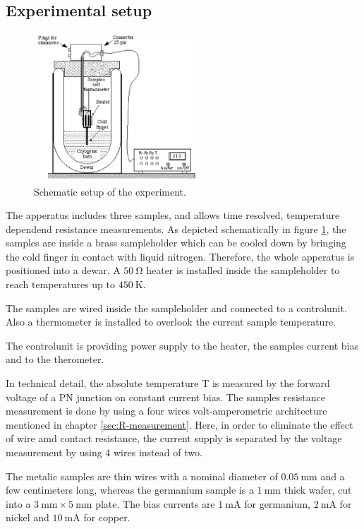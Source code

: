 \subsection{Experimental setup}
\label{sec:setup}

\begin{figure}
  \centering
  \includegraphics[width=0.55\textwidth]{graphics/setup.png}
  \caption[width=0.4\textwidth]{Schematic setup of the experiment\cite{instruction}.}
  \label{fig:setup}
\end{figure}

The apperatus includes three samples, and allows time resolved, temperature dependend resistance measurements.
As depicted schematically in figure \ref{fig:setup}, the samples are inside a brass sampleholder which can be cooled down by bringing the cold finger in contact with liquid nitrogen.
Therefore, the whole apperatus is positioned into a dewar.
A $\SI{50}{\ohm}$ heater is installed inside the sampleholder to reach temperatures up to $\SI{450}{\kelvin}$.

The samples are wired inside the sampleholder and connected to a controlunit.
Also a thermometer is installed to overlook the current sample temperature.

The controlunit is providing power supply to the heater, the samples current bias and to the therometer.

In technical detail, the absolute temperature T is measured by the forward voltage of a PN junction on constant current bias. 
The samples resistance measurement is done by using a four wires volt-amperometric architecture mentioned in chapter \ref{sec:R-measurement}. 
Here, in order to eliminate the effect of wire amd contact resistance, the current supply is separated by the voltage measurement by using 4 wires instead of two.

The metalic samples are thin wires with a nominal diameter of $\SI{0.05}{\milli\meter}$ and a few centimeters long, whereas the germanium sample is a $\SI{1}{\milli\meter}$ thick wafer, cut into a $\SI{3}{\milli\meter} \times \SI{5}{\milli\meter}$ plate.
The bias currents are $\SI{1}{\milli\ampere}$ for germanium, $\SI{2}{\milli\ampere}$ for nickel and $\SI{10}{\milli\ampere}$ for copper.

